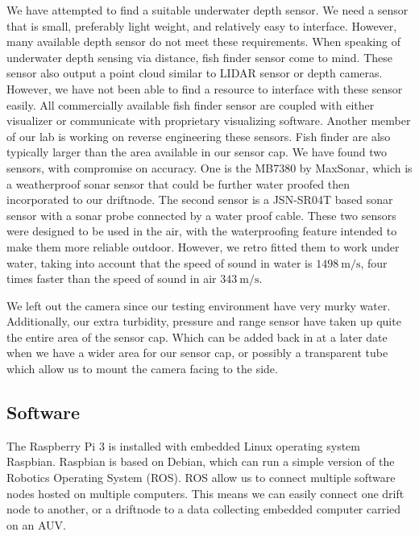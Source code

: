 We have attempted to find a suitable underwater depth sensor.
We need a sensor that is small, preferably light weight, and relatively easy to interface.
However, many available depth sensor do not meet these requirements.
When speaking of underwater depth sensing via distance, fish finder sensor come to mind.
These sensor also output a point cloud similar to LIDAR sensor or depth cameras.
However, we have not been able to find a resource to interface with these sensor easily.
All commercially available fish finder sensor are coupled with either visualizer or communicate with proprietary visualizing software.
Another member of our lab is working on reverse engineering these sensors.
Fish finder are also typically larger than the area available in our sensor cap.
We have found two sensors, with compromise on accuracy.
One is the MB7380 by MaxSonar, which is a weatherproof sonar sensor that could be further water proofed then incorporated to our driftnode.
The second sensor is a JSN-SR04T based sonar sensor with a sonar probe connected by a water proof cable.
These two sensors were designed to be used in the air, with the waterproofing feature intended to make them more reliable outdoor.
However, we retro fitted them to work under water, taking into account that the speed of sound in water is $\SI{1498}{\metre/\second}$, four times faster than the speed of sound in air $\SI{343}{\metre/\second}$.

We left out the camera since our testing environment have very murky water.
Additionally, our extra turbidity, pressure and range sensor have taken up quite the entire area of the sensor cap.
Which can be added back in at a later date when we have a wider area for our sensor cap, or possibly a transparent tube which allow us to mount the camera facing to the side.

\subsection[Software]{Software}

The Raspberry Pi 3 is installed with embedded Linux operating system Raspbian.
Raspbian is based on Debian, which can run a simple version of the Robotics Operating System (ROS).
ROS allow us to connect multiple software nodes hosted on multiple computers.
This means we can easily connect one drift node to another, or a driftnode to a data collecting embedded computer carried on an AUV.

